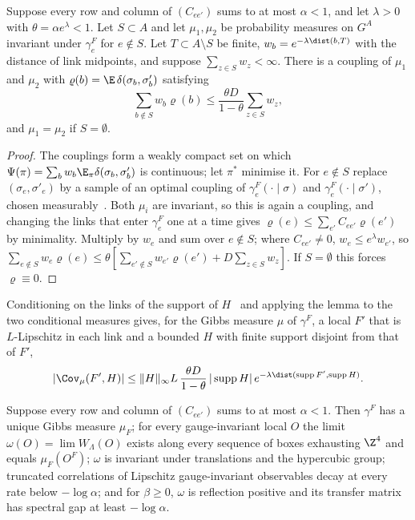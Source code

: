 \begin{lemma}[comparison]\label{lem:comparison}
Suppose every row and column of $(C_{ee'})$ sums to at most $\alpha<1$, and let
$\lambda>0$ with $\theta=\alpha e^\lambda<1$. Let $S\subset A$ and let $\mu_1,\mu_2$
be probability measures on $G^A$ invariant under $\gamma^F_e$ for $e\notin S$.
Let $T\subset A\setminus S$ be finite, $w_b=e^{-\lambda\dist(b,T)}$ with the
distance of link midpoints, and suppose $\sum_{z\in S}w_z<\infty$. There is a
coupling of $\mu_1$ and $\mu_2$ with $\varrho(b)=\E\,\delta(\sigma_b,\sigma'_b)$
satisfying
\[
\sum_{b\notin S}w_b\varrho(b)\le\frac{\theta D}{1-\theta}\sum_{z\in S}w_z ,
\]
and $\mu_1=\mu_2$ if $S=\emptyset$.
\end{lemma}

\begin{proof}
The couplings form a weakly compact set on which $\Psi(\pi)=\sum_bw_b\E_\pi
\delta(\sigma_b,\sigma'_b)$ is continuous; let $\pi^*$ minimise it. For $e\notin S$
replace $(\sigma_e,\sigma'_e)$ by a sample of an optimal coupling of
$\gamma^F_e(\cdot\mid\sigma)$ and $\gamma^F_e(\cdot\mid\sigma')$, chosen
measurably~\cite[Cor.~5.22]{Vil09}. Both $\mu_i$ are invariant, so this is again
a coupling, and changing the links that enter $\gamma^F_e$ one at a time gives
$\varrho(e)\le\sum_{e'}C_{ee'}\varrho(e')$ by minimality. Multiply by $w_e$ and sum
over $e\notin S$; where $C_{ee'}\ne0$, $w_e\le e^\lambda w_{e'}$, so
$\sum_{e\notin S}w_e\varrho(e)\le\theta[\sum_{e'\notin S}w_{e'}\varrho(e')+D\sum_{z
\in S}w_z]$. If $S=\emptyset$ this forces $\varrho\equiv0$.
\end{proof}

Conditioning on the links of the support of $H$~\cite[Ch.~3]{Kal21} and
applying the lemma to the two conditional measures gives, for the Gibbs
measure $\mu$ of $\gamma^F$, a local $F'$ that is $L$-Lipschitz in each link and
a bounded $H$ with finite support disjoint from that of $F'$,
\begin{equation}\label{eq:decay}
|\Cov_\mu(F',H)|\le\|H\|_\infty L\,\frac{\theta D}{1-\theta}\,|\operatorname{supp}H|\,
e^{-\lambda\dist(\operatorname{supp}F',\operatorname{supp}H)} .
\end{equation}

\begin{proposition}\label{prop:state}
Suppose every row and column of $(C_{ee'})$ sums to at most $\alpha<1$. Then
$\gamma^F$ has a unique Gibbs measure $\mu_F$; for every gauge-invariant local $O$
the limit $\omega(O)=\lim W_\Lambda(O)$ exists along every sequence of boxes
exhausting $\Z^4$ and equals $\mu_F(O^F)$; $\omega$ is invariant under
translations and the hypercubic group; truncated correlations of Lipschitz
gauge-invariant observables decay at every rate below $-\log\alpha$; and for
$\beta\ge0$, $\omega$ is reflection positive and its transfer matrix has
spectral gap at least $-\log\alpha$.
\end{proposition}

